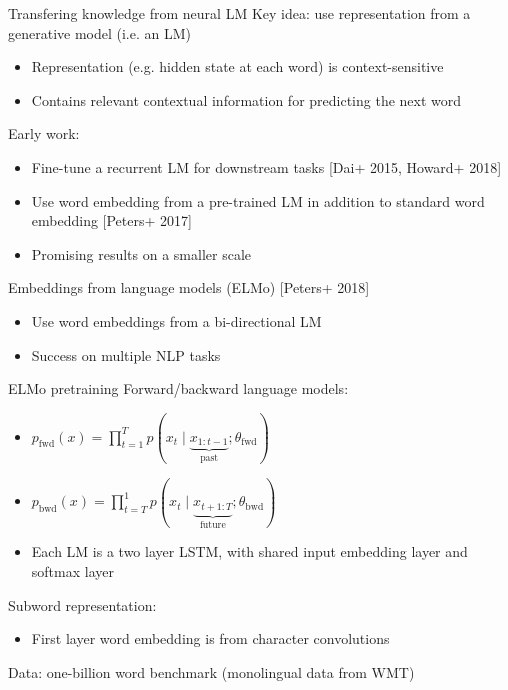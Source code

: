 \documentclass[usenames,dvipsnames,notes]{beamer}
\begin{document}
\begin{frame}
    {Transfering knowledge from neural LM}
    Key idea: use representation from a generative model (i.e. an LM) \\
    \begin{itemize}
        \item Representation (e.g. hidden state at each word) is context-sensitive
        \item Contains relevant contextual information for predicting the next word
    \end{itemize}

    Early work:\\
    \begin{itemize}
        \item Fine-tune a recurrent LM for downstream tasks [Dai+ 2015, Howard+ 2018]
        \item Use word embedding from a pre-trained LM in addition to standard word embedding [Peters+ 2017]
        \item Promising results on a smaller scale
    \end{itemize}

    Embeddings from language models (ELMo) [Peters+ 2018]\\
    \begin{itemize}
        \item Use word embeddings from a bi-directional LM
        \item Success on multiple NLP tasks
    \end{itemize}
\end{frame}

\begin{frame}
    {ELMo pretraining}
        Forward/backward language models:\\
            \begin{itemize}
                \item $p_{\text{fwd}}(x) = \prod_{t=1}^T p(x_t\mid \underbrace{x_{1:t-1}}_{\text{past}}; \theta_{\text{fwd}})$
                \item $p_{\text{bwd}}(x) = \prod_{t=T}^1 p(x_t\mid \underbrace{x_{t+1:T}}_{\text{future}}; \theta_{\text{bwd}})$
                \item Each LM is a two layer LSTM,
                with shared input embedding layer and softmax layer
            \end{itemize}

        Subword representation:\\
            \begin{itemize}
                \item First layer word embedding is from character convolutions
            \end{itemize}

        Data: one-billion word benchmark (monolingual data from WMT)
\end{frame}
\end{document}
